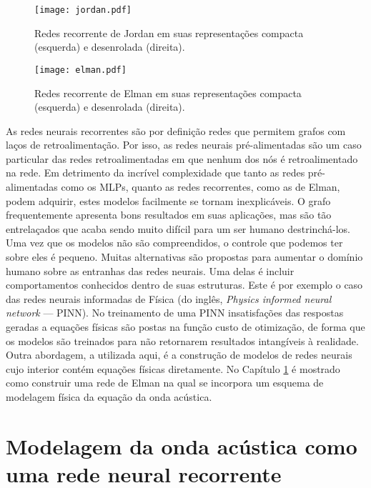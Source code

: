       \begin{figure}
        \begin{center}
          \texttt{[image: jordan.pdf]}
        \end{center}
        \caption{Redes recorrente de Jordan em suas representações compacta (esquerda) e desenrolada (direita).}
        \label{f:jordan}
      \end{figure}

      \begin{figure}
        \begin{center}
          \texttt{[image: elman.pdf]}
        \end{center}
        \caption{Redes recorrente de Elman em suas representações compacta (esquerda) e desenrolada (direita).}
        \label{f:elman}
      \end{figure}

      As redes neurais recorrentes são por definição redes que permitem grafos com laços de retroalimentação. Por isso, as redes neurais pré-alimentadas são um caso particular das redes retroalimentadas em que nenhum dos nós é retroalimentado na rede. Em detrimento da incrível complexidade que tanto as redes pré-alimentadas como os MLPs, quanto as redes recorrentes, como as de Elman, podem adquirir, estes modelos facilmente se tornam inexplicáveis. O grafo frequentemente apresenta bons resultados em suas aplicações, mas são tão entrelaçados que acaba sendo muito difícil para um ser humano destrinchá-los. Uma vez que os modelos não são compreendidos, o controle que podemos ter sobre eles é pequeno. Muitas alternativas são propostas para aumentar o domínio humano sobre as entranhas das redes neurais. Uma delas é incluir comportamentos conhecidos dentro de suas estruturas. Este é por exemplo o caso das redes neurais informadas de Física (do inglês, \textit{Physics informed neural network} --- PINN). No treinamento de uma PINN insatisfações das respostas geradas a equações físicas são postas na função custo de otimização, de forma que os modelos são treinados para não retornarem resultados intangíveis à realidade. Outra abordagem, a utilizada aqui, é a construção de modelos de redes neurais cujo interior contém equações físicas diretamente. No Capítulo \ref{c:modelagem_por_rnn} é mostrado como construir uma rede de Elman na qual se incorpora um esquema de modelagem física da equação da onda acústica.


\chapter{Modelagem da onda acústica como uma rede neural recorrente} \label{c:modelagem_por_rnn}

